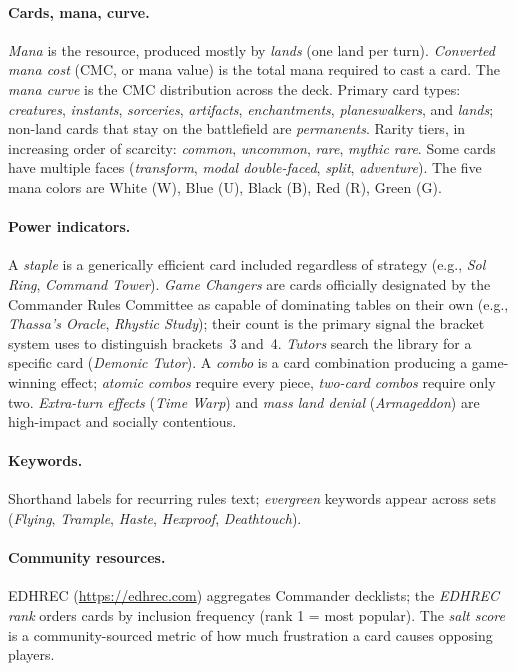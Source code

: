 \documentclass{article}
\begin{document}
\paragraph{Cards, mana, curve.} \textit{Mana} is the resource, produced mostly by \textit{lands} (one land per turn). \textit{Converted mana cost} (CMC, or mana value) is the total mana required to cast a card. The \textit{mana curve} is the CMC distribution across the deck. Primary card types: \textit{creatures}, \textit{instants}, \textit{sorceries}, \textit{artifacts}, \textit{enchantments}, \textit{planeswalkers}, and \textit{lands}; non-land cards that stay on the battlefield are \textit{permanents}. Rarity tiers, in increasing order of scarcity: \textit{common}, \textit{uncommon}, \textit{rare}, \textit{mythic rare}. Some cards have multiple faces (\textit{transform}, \textit{modal double-faced}, \textit{split}, \textit{adventure}). The five mana colors are White (W), Blue (U), Black (B), Red (R), Green (G).

\paragraph{Power indicators.} A \textit{staple} is a generically efficient card included regardless of strategy (e.g., \textit{Sol Ring}, \textit{Command Tower}). \textit{Game Changers} are cards officially designated by the Commander Rules Committee as capable of dominating tables on their own (e.g., \textit{Thassa's Oracle}, \textit{Rhystic Study}); their count is the primary signal the bracket system uses to distinguish brackets~3 and~4. \textit{Tutors} search the library for a specific card (\textit{Demonic Tutor}). A \textit{combo} is a card combination producing a game-winning effect; \textit{atomic combos} require every piece, \textit{two-card combos} require only two. \textit{Extra-turn effects} (\textit{Time Warp}) and \textit{mass land denial} (\textit{Armageddon}) are high-impact and socially contentious.

\paragraph{Keywords.} Shorthand labels for recurring rules text; \textit{evergreen} keywords appear across sets (\textit{Flying}, \textit{Trample}, \textit{Haste}, \textit{Hexproof}, \textit{Deathtouch}).

\paragraph{Community resources.} EDHREC (\url{https://edhrec.com}) aggregates Commander decklists; the \textit{EDHREC rank} orders cards by inclusion frequency (rank 1 = most popular). The \textit{salt score} is a community-sourced metric of how much frustration a card causes opposing players.
\end{document}
